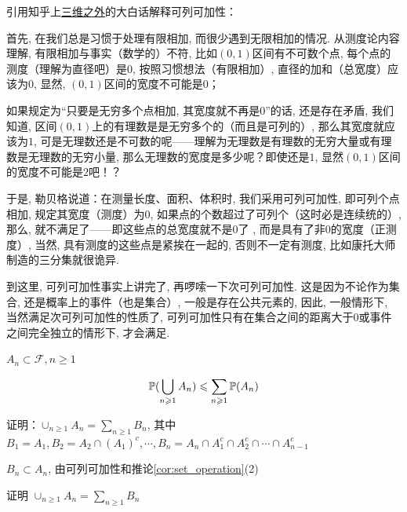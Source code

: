 \begin{remark}
    引用知乎上\href{https://www.zhihu.com/question/25836213/answer/1204497999}{三维之外}的大白话解释可列可加性：

    首先, 在我们总是习惯于处理有限相加, 而很少遇到无限相加的情况. 从测度论内容理解, 有限相加与事实（数学的）不符, 比如$(0,1)$区间有不可数个点, 每个点的测度（理解为直径吧）是$0$, 按照习惯想法（有限相加）, 直径的加和（总宽度）应该为$0$, 显然, $(0,1)$区间的宽度不可能是$0$；
    
    如果规定为“只要是无穷多个点相加, 其宽度就不再是$0$”的话, 还是存在矛盾, 我们知道, 区间$(0,1)$上的有理数是是无穷多个的（而且是可列的）, 那么其宽度就应该为$1$, 可是无理数还是不可数的呢——理解为无理数是有理数的无穷大量或有理数是无理数的无穷小量, 那么无理数的宽度是多少呢？即使还是$1$, 显然$(0,1)$区间的宽度不可能是$2$吧！？
    
    于是, 勒贝格说道：在测量长度、面积、体积时, 我们采用可列可加性, 即可列个点相加, 规定其宽度（测度）为$0$, 如果点的个数超过了可列个（这时必是连续统的）, 那么, 就不满足了——即这些点的总宽度就不是$0$了 , 而是具有了非$0$的宽度（正测度）, 当然, 具有测度的这些点是紧挨在一起的, 否则不一定有测度, 比如康托大师制造的三分集就很诡异. 
    
    到这里, 可列可加性事实上讲完了, 再啰嗦一下次可列可加性. 这是因为不论作为集合, 还是概率上的事件（也是集合）, 一般是存在公共元素的, 因此, 一般情形下, 当然满足次可列可加性的性质了, 可列可加性只有在集合之间的距离大于$0$或事件之间完全独立的情形下, 才会满足. 
\end{remark}

\begin{property}[次可列可加性]
    $A_n\subset \mathcal{F}, n\geq 1$

    \[
    \mathbb{P}(\bigcup_{n\geqslant 1}A_n)\leqslant \sum_{n\geqslant 1}\mathbb{P}(A_n)
    \]
\end{property}

证明：$\cup_{n\geq 1}A_n=\sum_{n\geq 1}B_n$, 其中 $B_1=A_1, B_2=A_2\cap (A_1)^c,\cdots , B_n=A_n\cap A_1^c\cap A_2^c\cap \cdots \cap A_{n-1}^c$

$B_n\subset A_n$, 由可列可加性和推论\ref{cor:set_operation}(2)

\begin{problem}[作业1-2]\label{exer:disjoint_union}
证明 $\cup_{n\geq 1}A_n=\sum_{n\geq 1}B_n$
\end{problem}

